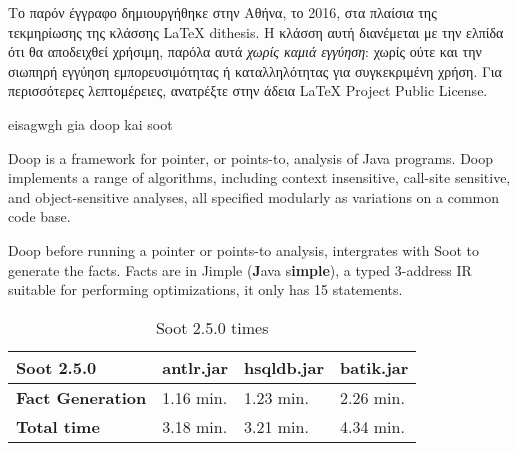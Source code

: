 \documentclass{dithesis}
\begin{document}
\tableofcontents
\listoffigures
\listoftables
{}


\begin{thesisprologue}[PROLOGUE]
    Το παρόν έγγραφο δημιουργήθηκε στην Αθήνα, το 2016, στα πλαίσια της 
    τεκμηρίωσης της κλάσσης \LaTeX{} dithesis.
    Η κλάσση αυτή διανέμεται με την ελπίδα ότι θα αποδειχθεί χρήσιμη, παρόλα αυτά 
    \emph{χωρίς καμιά εγγύηση}: χωρίς ούτε και την σιωπηρή εγγύηση 
    εμπορευσιμότητας ή καταλληλότητας για συγκεκριμένη χρήση.
    Για περισσότερες λεπτομέρειες, ανατρέξτε στην άδεια LaTeX Project Public 
    License.
\end{thesisprologue}

    eisagwgh gia doop kai soot

    Doop is a framework for pointer, or points-to, analysis of Java programs. 
    Doop implements a range of algorithms, including context insensitive, call-site sensitive, 
    and object-sensitive analyses, all specified modularly as variations on a common code base.
    \cite{Doop: Framework for Java Pointer Analysis}

        Doop before running a pointer or points-to analysis, intergrates with Soot to generate
        the facts. Facts are in Jimple (\textbf{J}ava s\textbf{imple}), a typed 3-address IR suitable for performing optimizations, it only has 15 statements.

        \begin{table}[H]
            \centering
            \label{my-label}
            \begin{tabular}{llll}
                \hline
                \textbf{Soot 2.5.0}      & \textbf{antlr.jar} & \textbf{hsqldb.jar} & \textbf{batik.jar} \\ \hline
                \textbf{Fact Generation} & 1.16 min.          & 1.23 min.           & 2.26 min.          \\
                \textbf{Total time}      & 3.18 min.          & 3.21 min.           & 4.34 min.          \\ \hline
            \end{tabular}
            \caption{Soot 2.5.0 times}
        \end{table}
\end{document}
